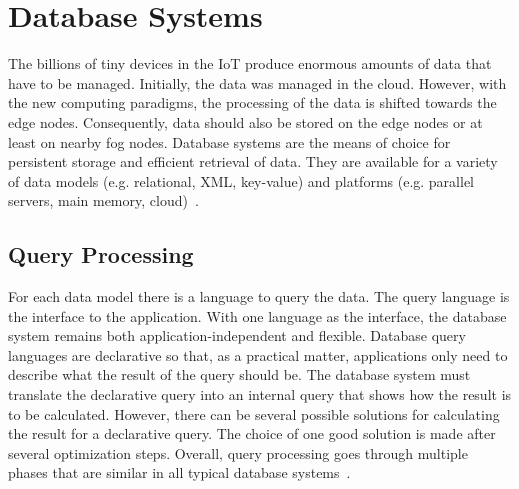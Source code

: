 \documentclass[english,version-2019-11]{uzl-thesis}
\begin{document}
\section{Database Systems}
The billions of tiny devices in the IoT produce enormous amounts of data that have to be managed. Initially, the data was managed in the cloud. However, with the new computing paradigms, the processing of the data is shifted towards the edge nodes. Consequently, data should also be stored on the edge nodes or at least on nearby fog nodes. Database systems are the means of choice for persistent storage and efficient retrieval of data. They are available for a variety of data models (e.g. relational, XML, key-value) and platforms (e.g. parallel servers, main memory, cloud)~\cite{HM3P}.

\subsection{Query Processing}
 For each data model there is a language to query the data. The query language is the interface to the application. With one language as the interface, the database system remains both application-independent and flexible. Database query languages are declarative so that, as a practical matter, applications only need to describe what the result of the query should be. The database system must translate the declarative query into an internal query that shows how the result is to be calculated. However, there can be several possible solutions for calculating the result for a declarative query. The choice of one good solution is made after several optimization steps. Overall, query processing goes through multiple phases that are similar in all typical database systems~\cite{SWBook}.
\end{document}
